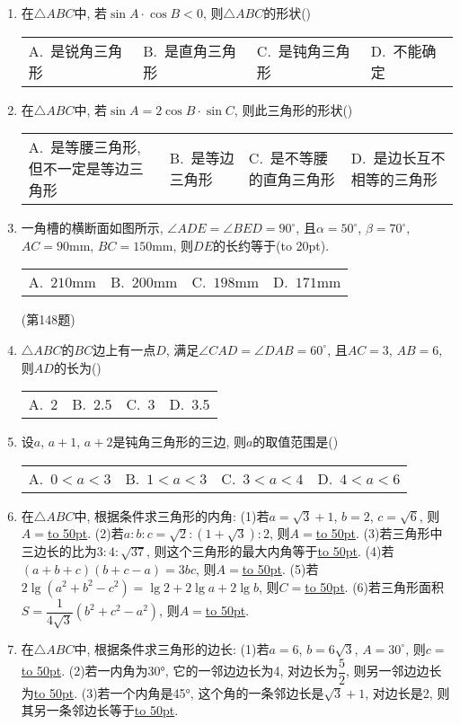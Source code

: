 \documentclass[10pt,a4paper]{article}
\newcommand{\blank}[1]{\underline{\hbox to #1pt{}}}
\newcommand{\bracket}[1]{(\hbox to #1pt{})}
\newcommand{\fourch}[4]{\par\begin{tabular}{p{.23\textwidth}p{.23\textwidth}p{.23\textwidth}p{.23\textwidth}}
A.~#1 &B.~#2& C.~#3& D.~#4
\end{tabular}}
\begin{document}
\begin{enumerate}[1.]
\fourch{不等腰的锐角三角形}{直角三角形}{不等腰的钝角三角形}{等腰三角形}
\item 在$\triangle ABC$中, 若$\sin A\cdot \cos B<0$, 则$\triangle ABC$的形状()
\fourch{是锐角三角形}{是直角三角形}{是钝角三角形}{不能确定}
\item 在$\triangle ABC$中, 若$\sin A=2\cos B\cdot \sin C$, 则此三角形的形状()
\fourch{是等腰三角形, 但不一定是等边三角形}{是等边三角形}{是不等腰的直角三角形}{是边长互不相等的三角形}
\item 一角槽的横断面如图所示, $\angle ADE = \angle BED=90^\circ$, 且$\alpha =50^\circ$, $\beta =70^\circ$, $AC=90\text{mm}$, $BC=150\text{mm}$, 则$DE$的长约等于\bracket{20}.
\begin{center}
\end{center}
\fourch{$210\text{mm}$}{$200\text{mm}$}{$198\text{mm}$}{$171\text{mm}$}
(第148题)
\item $\triangle ABC$的$BC$边上有一点$D$, 满足$\angle CAD=\angle DAB=60^{\circ}$, 且$AC=3$, $AB=6$, 则$AD$的长为()
\fourch{2}{2.5}{3}{3.5}
\item 设$a$, $a+1$, $a+2$是钝角三角形的三边, 则$a$的取值范围是()
\fourch{$0<a<3$}{$1<a<3$}{$3<a<4$}{$4<a<6$}
\item 在$\triangle ABC$中, 根据条件求三角形的内角:
(1)若$a=\sqrt 3+1$, $b=2$, $c=\sqrt 6$, 则$A=$\blank{50}.
(2)若$a:b:c=\sqrt 2:(1+\sqrt 3):2$, 则$A=$\blank{50}.
(3)若三角形中三边长的比为$3:4:\sqrt {37}$, 则这个三角形的最大内角等于\blank{50}.
(4)若$(a+b+c)(b+c-a)=3bc$, 则$A=$\blank{50}.
(5)若$2\lg (a^2+b^2-c^2)=\lg 2+2\lg a+2\lg b$, 则$C=$\blank{50}.
(6)若三角形面积$S=\dfrac 1{4\sqrt 3}(b^2+c^2-a^2)$, 则$A=$\blank{50}.
\item 在$\triangle ABC$中, 根据条件求三角形的边长:
(1)若$a=6$, $b=6\sqrt 3$, $A=30^\circ$, 则$c=$\blank{50}.
(2)若一内角为30°, 它的一邻边边长为4, 对边长为$\dfrac 52$, 则另一邻边边长为\blank{50}.
(3)若一个内角是45°, 这个角的一条邻边长是$\sqrt 3+1$, 对边长是2, 则其另一条邻边长等于\blank{50}.

\end{enumerate}
\end{document}
